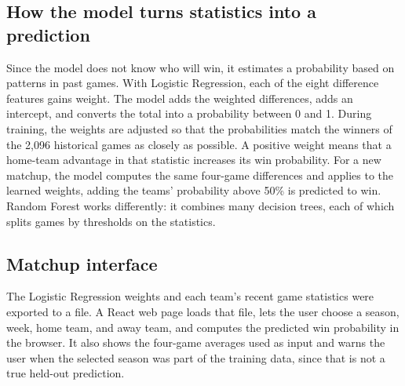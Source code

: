 \documentclass[sigconf,nonacm]{acmart}
\begin{document}
\subsection{How the model turns statistics into a prediction}
Since the model does not know who will win, it estimates a probability based on patterns in past games. With Logistic Regression, each of the eight difference features gains weight. The model adds the weighted differences, adds an intercept, and converts the total into a probability between 0 and 1. During training, the weights are adjusted so that the probabilities match the winners of the 2,096 historical games as closely as possible. A positive weight means that a home-team advantage in that statistic increases its win probability. For a new matchup, the model computes the same four-game differences and applies to the learned weights, adding the teams' probability above 50\% is predicted to win. Random Forest works differently: it combines many decision trees, each of which splits games by thresholds on the statistics.

\subsection{Matchup interface}
The Logistic Regression weights and each team's recent game statistics were exported to a file. A React web page loads that file, lets the user choose a season, week, home team, and away team, and computes the predicted win probability in the browser. It also shows the four-game averages used as input and warns the user when the selected season was part of the training data, since that is not a true held-out prediction.
\end{document}
